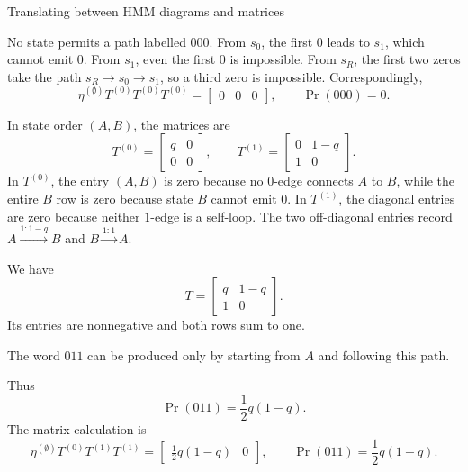 \begin{exercise}[Core]{Translating between HMM diagrams and matrices}
\begin{solution}
\begin{parts}
\begin{subparts}
            No state permits a path labelled $000$. From $s_0$, the first
            $0$ leads to $s_1$, which cannot emit $0$. From $s_1$, even
            the first $0$ is impossible. From $s_R$, the first two zeros
            take the path $s_R\to s_0\to s_1$, so a third zero is impossible.
            Correspondingly,
            \[
              \eta^{(\emptyset)}T^{(0)}T^{(0)}T^{(0)}
                =\begin{bmatrix}0&0&0\end{bmatrix},
              \qquad
              \Pr(000)=0.
            \]
        \end{subparts}

      \item
        \begin{subparts}
          \item In state order $(A,B)$, the matrices are
            \[
              T^{(0)}=
              \begin{bmatrix}
                q&0\\
                0&0
              \end{bmatrix},
              \qquad
              T^{(1)}=
              \begin{bmatrix}
                0&1-q\\
                1&0
              \end{bmatrix}.
            \]
            In $T^{(0)}$, the entry $(A,B)$ is zero because no $0$-edge
            connects $A$ to $B$, while the entire $B$ row is zero because
            state $B$ cannot emit $0$. In $T^{(1)}$, the diagonal entries are
            zero because neither $1$-edge is a self-loop. The two off-diagonal
            entries record $A\xrightarrow{1:1-q}B$ and
            $B\xrightarrow{1:1}A$.

          \item We have
            \[
              T=
              \begin{bmatrix}
                q&1-q\\
                1&0
              \end{bmatrix}.
            \]
            Its entries are nonnegative and both rows sum to one.

          \item The word $011$ can be produced only by starting from $A$ and
            following this path.
            \par\nobreak
            {\centering{}\par}
            Thus
            \[
              \Pr(011)=\frac12q(1-q).
            \]
            The matrix calculation is
            \[
              \eta^{(\emptyset)}T^{(0)}T^{(1)}T^{(1)}
                =\begin{bmatrix}\tfrac12q(1-q)&0\end{bmatrix},
              \qquad
              \Pr(011)=\frac12q(1-q).
            \]


\end{subparts}
\end{parts}
\end{solution}
\end{exercise}
